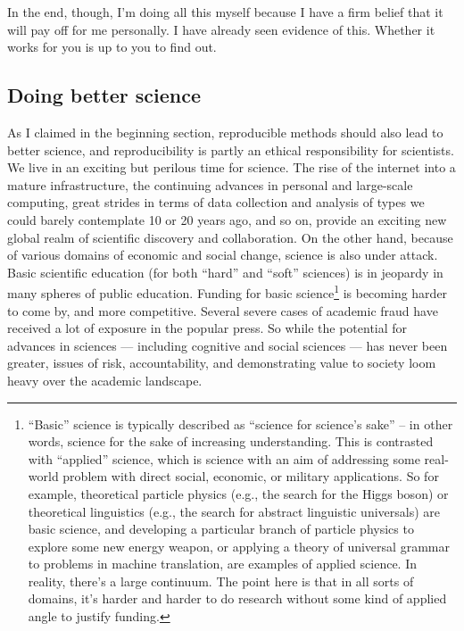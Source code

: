 \documentclass{book}
\begin{document}
In the end, though, I'm doing all this myself because I have a firm belief that it will pay off for me personally.  I have already seen evidence of this. Whether it works for you is up to you to find out.
\subsection{Doing better science}
\label{sec-2-3-2}

As I claimed in the beginning section, reproducible methods should also lead to better science, and reproducibility is partly an ethical responsibility for scientists. We live in an exciting but perilous time for science. The rise of the internet into a mature infrastructure, the continuing advances in personal and large-scale computing, great strides in terms of data collection and analysis of types we could barely contemplate 10 or 20 years ago, and so on, provide an exciting new global realm of scientific discovery and collaboration. On the other hand, because of various domains of economic and social change, science is also under attack.  Basic scientific education (for both ``hard'' and ``soft'' sciences) is in jeopardy in many spheres of public education.  Funding for basic science\footnote{``Basic'' science is typically described as ``science for science's sake'' -- in other words, science for the sake of increasing understanding. This is contrasted with ``applied'' science, which is science with an aim of addressing some real-world problem with direct social, economic, or military applications. So for example, theoretical particle physics (e.g., the search for the Higgs boson) or theoretical linguistics (e.g., the search for abstract linguistic universals) are basic science, and developing a particular branch of particle physics to explore some new energy weapon, or applying a theory of universal grammar to problems in machine translation, are examples of applied science. In reality, there's a large continuum. The point here is that in all sorts of domains, it's harder and harder to do research without some kind of applied angle to justify funding.
 } is becoming harder to come by, and more competitive.  Several severe cases of academic fraud have received a lot of exposure in the popular press. So while the potential for advances in sciences --- including cognitive and social sciences --- has never been greater, issues of risk, accountability, and demonstrating value to society loom heavy over the academic landscape.
\end{document}
